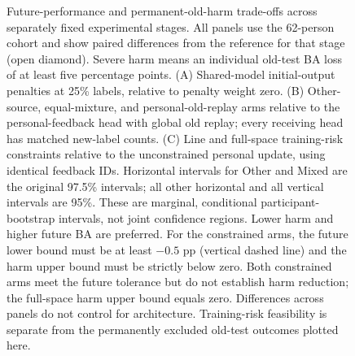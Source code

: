 \documentclass[11pt,a4paper]{article}
\begin{document}
\begin{figure}[t]
\endgroup
\caption{Future-performance and permanent-old-harm trade-offs across separately fixed experimental stages. All panels use the 62-person cohort and show paired differences from the reference for that stage (open diamond). Severe harm means an individual old-test BA loss of at least five percentage points. (A) Shared-model initial-output penalties at 25\% labels, relative to penalty weight zero. (B) Other-source, equal-mixture, and personal-old-replay arms relative to the personal-feedback head with global old replay; every receiving head has matched new-label counts. (C) Line and full-space training-risk constraints relative to the unconstrained personal update, using identical feedback IDs. Horizontal intervals for Other and Mixed are the original 97.5\% intervals; all other horizontal and all vertical intervals are 95\%. These are marginal, conditional participant-bootstrap intervals, not joint confidence regions. Lower harm and higher future BA are preferred. For the constrained arms, the future lower bound must be at least $-0.5$ pp (vertical dashed line) and the harm upper bound must be strictly below zero. Both constrained arms meet the future tolerance but do not establish harm reduction; the full-space harm upper bound equals zero. Differences across panels do not control for architecture. Training-risk feasibility is separate from the permanently excluded old-test outcomes plotted here.}
\label{fig:retention-tradeoffs}
\end{figure}
\end{document}
